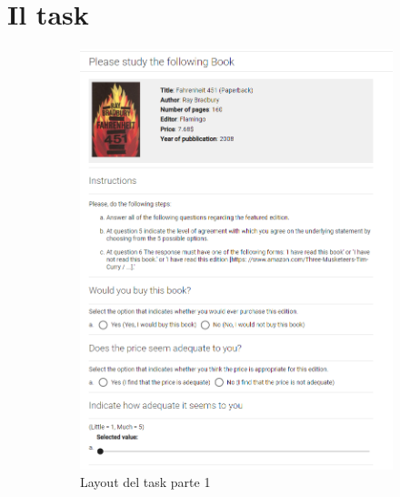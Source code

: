 \documentclass[a4paper,11pt]{report}
\begin{document}
\section{Il task}
\begin{figure}[H]
	\begin{subfigure}{.49\textwidth}
		\centering
		\includegraphics[width=1.043\linewidth]{task}
		\caption{Layout del task parte 1}
		\label{fig:task_layout}
	\end{subfigure}%
	\begin{subfigure}{.49\textwidth}
		\centering

\end{subfigure}
\end{figure}
\end{document}
